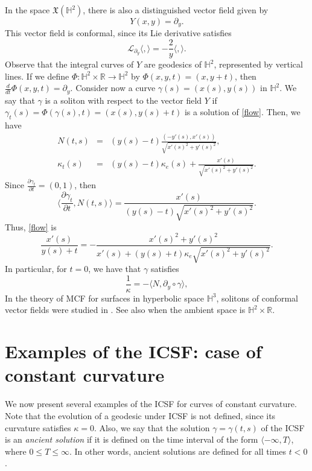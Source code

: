 \documentclass[12pt]{amsart}
\theoremstyle{plain}
\theoremstyle{definition}
\def\h{\mathbb H}
\def\r{\mathbb R}
\begin{document}
In the space $\mathfrak{X}(\h^2)$,  there is also a distinguished  vector field given by 
$$Y(x,y)=\partial_y.$$
This vector field is conformal, since its Lie derivative satisfies 
$$\mathcal{L}_{\partial_y}\langle,\rangle=-\frac{2}{y}\langle,\rangle.$$
 Observe that the integral curves of $Y$ are geodesics of $\h^2$, represented  by vertical lines. If we define $\Phi\colon\h^2\times\r\to\h^2$ by $\Phi(x,y,t)=(x,y+t)$, then $\frac{d}{dt}\Phi(x,y,t)=\partial_y$. 
Consider now a curve $\gamma(s)=(x(s),y(s))$ in $\h^2$.  We say that $\gamma$ is a soliton with respect to the vector field $Y$ if $\gamma_t(s)=\Phi(\gamma(s),t)=(x(s),y(s)+t)$ is a solution of \eqref{flow}.  Then, we have 
\begin{eqnarray*}
N(t,s)&=&(y(s)-t)\frac{(-y'(s),x'(s))}{\sqrt{x'(s)^2+y'(s)^2}}, \\
\kappa_t(s)&=&(y(s)-t)\kappa_e(s)+\frac{x'(s)}{\sqrt{x'(s)^2+y'(s)^2}}.
\end{eqnarray*} 
Since $ \frac{\partial \gamma_t}{\partial t}=(0,1)$, then 
$$\langle \frac{\partial \gamma_t}{\partial t},  N(t,s)\rangle = \frac{ x'(s)}{(y(s)-t)\sqrt{x'(s)^2+y'(s)^2}}.$$
Thus, \eqref{flow} is 
$$\frac{x'(s)}{y(s)+t} = -\frac{x'(s)^2+y'(s)^2}{x'(s)+(y(s)+t)\kappa_e\sqrt{x'(s)^2+y'(s)^2}}.$$
In particular, for $t=0$, we have that $\gamma$ satisfies
\begin{equation}\label{conformal}
\frac{1}{\kappa}=-\langle N,\partial_y\circ\gamma\rangle,
\end{equation}
In the theory of MCF for surfaces in hyperbolic space $\h^3$, solitons of   conformal vector fields  were studied in \cite{bl1,ma}. See also  \cite{bl2} when the ambient space is $\h^2\times\r$.

 
\section{Examples of the ICSF: case of constant curvature} \label{sec3}
 
We now present several examples of the ICSF for curves of constant curvature. Note that the evolution of a geodesic under ICSF is not defined, since its curvature satisfies $\kappa=0$. Also, we say that the solution $\gamma = \gamma(t,s)$ of the ICSF is an \textit{ancient solution} if it is defined on the time interval of the form $\langle - \infty, T \rangle$, where $0 \leq T \leq \infty$. In other words, ancient solutions are defined for all times $t < 0$. 
\end{document}
